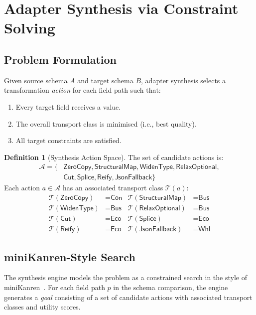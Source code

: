 \documentclass[11pt,a4paper]{article}
\theoremstyle{definition}
\newtheorem{definition}[theorem]{Definition}
\theoremstyle{remark}
\newcommand{\TC}{\mathcal{T}}                    %
\newcommand{\conc}{\textsf{Con}}                 %
\newcommand{\busi}{\textsf{Bus}}                 %
\newcommand{\econ}{\textsf{Eco}}                 %
\newcommand{\wheel}{\textsf{Whl}}               %
\begin{document}
\section{Adapter Synthesis via Constraint Solving}\label{sec:synthesis}

\subsection{Problem Formulation}

Given source schema $A$ and target schema $B$, adapter synthesis
selects a transformation \emph{action} for each field path such that:
\begin{enumerate}
  \item Every target field receives a value.
  \item The overall transport class is minimised (i.e., best quality).
  \item All target constraints are satisfied.
\end{enumerate}

\begin{definition}[Synthesis Action Space]\label{def:actions}
The set of candidate actions is:
\begin{align*}
  \mathcal{A} = \{&\textsf{ZeroCopy}, \textsf{StructuralMap},
    \textsf{WidenType}, \textsf{RelaxOptional}, \\
    &\textsf{Cut}, \textsf{Splice}, \textsf{Reify},
    \textsf{JsonFallback}\}
\end{align*}
Each action $a \in \mathcal{A}$ has an associated transport class
$\TC(a)$:
\begin{align*}
  \TC(\textsf{ZeroCopy}) &= \conc &
  \TC(\textsf{StructuralMap}) &= \busi \\
  \TC(\textsf{WidenType}) &= \busi &
  \TC(\textsf{RelaxOptional}) &= \busi \\
  \TC(\textsf{Cut}) &= \econ &
  \TC(\textsf{Splice}) &= \econ \\
  \TC(\textsf{Reify}) &= \econ &
  \TC(\textsf{JsonFallback}) &= \wheel
\end{align*}
\end{definition}

\subsection{miniKanren-Style Search}

The synthesis engine models the problem as a constrained search in
the style of miniKanren~\cite{byrd2017minikanren,
friedman2005reasoned}. For each field path $p$ in the schema
comparison, the engine generates a \emph{goal} consisting of a set
of candidate actions with associated transport classes and utility
scores.
\end{document}
